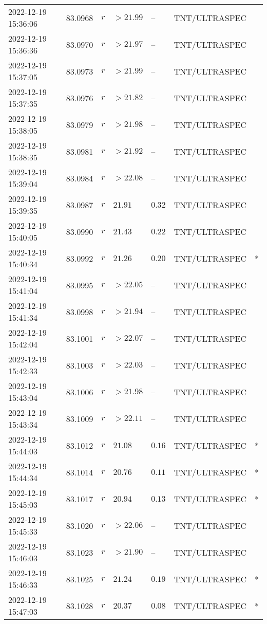 \documentclass{nature_plusfigure}
\begin{document}
\begin{supplement}
\begin{center}
\begin{longtable}{lllllll}
2022-12-19 15:36:06 & 83.0968 & $r$ & $>21.99$ & -- & TNT/ULTRASPEC &  \\ 
2022-12-19 15:36:36 & 83.0970 & $r$ & $>21.97$ & -- & TNT/ULTRASPEC &  \\ 
2022-12-19 15:37:05 & 83.0973 & $r$ & $>21.99$ & -- & TNT/ULTRASPEC &  \\ 
2022-12-19 15:37:35 & 83.0976 & $r$ & $>21.82$ & -- & TNT/ULTRASPEC &  \\ 
2022-12-19 15:38:05 & 83.0979 & $r$ & $>21.98$ & -- & TNT/ULTRASPEC &  \\ 
2022-12-19 15:38:35 & 83.0981 & $r$ & $>21.92$ & -- & TNT/ULTRASPEC &  \\ 
2022-12-19 15:39:04 & 83.0984 & $r$ & $>22.08$ & -- & TNT/ULTRASPEC &  \\ 
2022-12-19 15:39:35 & 83.0987 & $r$ & $21.91$ & $0.32$ & TNT/ULTRASPEC &  \\ 
2022-12-19 15:40:05 & 83.0990 & $r$ & $21.43$ & $0.22$ & TNT/ULTRASPEC &  \\ 
2022-12-19 15:40:34 & 83.0992 & $r$ & $21.26$ & $0.20$ & TNT/ULTRASPEC & * \\ 
2022-12-19 15:41:04 & 83.0995 & $r$ & $>22.05$ & -- & TNT/ULTRASPEC &  \\ 
2022-12-19 15:41:34 & 83.0998 & $r$ & $>21.94$ & -- & TNT/ULTRASPEC &  \\ 
2022-12-19 15:42:04 & 83.1001 & $r$ & $>22.07$ & -- & TNT/ULTRASPEC &  \\ 
2022-12-19 15:42:33 & 83.1003 & $r$ & $>22.03$ & -- & TNT/ULTRASPEC &  \\ 
2022-12-19 15:43:04 & 83.1006 & $r$ & $>21.98$ & -- & TNT/ULTRASPEC &  \\ 
2022-12-19 15:43:34 & 83.1009 & $r$ & $>22.11$ & -- & TNT/ULTRASPEC &  \\ 
2022-12-19 15:44:03 & 83.1012 & $r$ & $21.08$ & $0.16$ & TNT/ULTRASPEC & * \\ 
2022-12-19 15:44:34 & 83.1014 & $r$ & $20.76$ & $0.11$ & TNT/ULTRASPEC & * \\ 
2022-12-19 15:45:03 & 83.1017 & $r$ & $20.94$ & $0.13$ & TNT/ULTRASPEC & * \\ 
2022-12-19 15:45:33 & 83.1020 & $r$ & $>22.06$ & -- & TNT/ULTRASPEC &  \\ 
2022-12-19 15:46:03 & 83.1023 & $r$ & $>21.90$ & -- & TNT/ULTRASPEC &  \\ 
2022-12-19 15:46:33 & 83.1025 & $r$ & $21.24$ & $0.19$ & TNT/ULTRASPEC & * \\ 
2022-12-19 15:47:03 & 83.1028 & $r$ & $20.37$ & $0.08$ & TNT/ULTRASPEC & * \\ 

\end{longtable}
\end{center}
\end{supplement}
\end{document}
